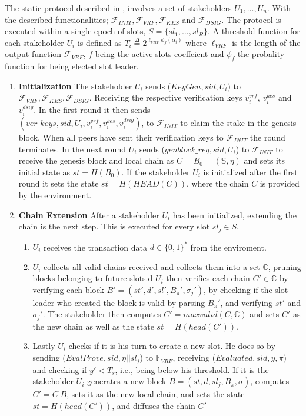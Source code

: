 The static protocol described in \cite{ouroboros-praos}, involves a set of stakeholders $U_1,\dots, U_n$. With the described functionalities; $\mathcal{F}_{INIT}, \mathcal{F}_{VRF}, \mathcal{F}_{KES}$ and $\mathcal{F}_{DSIG}$. The protocol is executed within a single epoch of slots, $S = \{sl_1, \dots, sl_R\}$. A threshold function for each stakeholder $U_i$ is defined as $T_i \overset{\Delta}{=} 2^{\ell_{VRF} \phi_f(\alpha_i)}$ where $\ell_{VRF}$ is the length of the output function $\mathcal{F}_{VRF}$, $f$ being the active slots coeffcient and $\phi_f$ the probality function for being elected slot leader.
\begin{enumerate}
    \item \textbf{Initialization} The stakeholder $U_i$ sends ($KeyGen, sid, U_i$) to $\mathcal{F}_{VRF}, \mathcal{F}_{KES}, \mathcal{F}_{DSIG}$. Receiving the respective verification keys $v_i^{vrf}$, $v_i^{kes}$ and $v_i^{dsig}$.  In the first round it then sends \\ $(ver\_keys, sid, U_i, v_i^{vrf}, v_i^{kes}, v_i^{dsig} )$, to $\mathcal{F}_{INIT}$ to claim the stake in the genesis block. When all peers have sent their verification keys to $\mathcal{F}_{INIT}$ the round terminates. In the next round $U_i$ sends ($genblock\_req, sid, U_i$) to $\mathcal{F}_{INIT}$ to receive the genesis block and local chain as $C = B_0 = (\mathbb{S}, \eta)$ and sets its initial state as $st = H(B_0)$. If the stakeholder $U_i$ is initialized after the first round it sets the state $st = H(HEAD(C))$, where the chain $C$ is provided by the environment.
    \item \textbf{Chain Extension} After a stakeholder $U_i$ has been initialized,  extending the chain is the next step. This is executed for every slot $sl_j  \in S$.
    \begin{enumerate}
        \item $U_i$ receives the transaction data $d \in \{0,1\}^*$ from the enviroment.
        \item $U_i$ collects all valid chains received and collects them into a set $\mathbb{C}$, pruning blocks belonging to future slots.d $U_i$ then verifies each chain $C' \in \mathbb{C}$ by verifying each block $B' = (st',d', sl', B_{\pi}', \sigma_j')$, by checking if the slot leader who created the block is valid by parsing $B_{\pi}'$, and verifying $st'$ and $\sigma_j'$. The stakeholder then computes $C' = maxvalid(C,\mathbb{C})$ and sets $C'$ as the new chain as well as the state $st = H(head(C'))$.
        \item Lastly $U_i$ checks if it is his turn to create a new slot. He does so by sending ($EvalProve, sid, \eta || sl_j$) to $\mathbb{F}_{VRF}$, receiving ($Evaluated, sid, y, \pi$) and checking if $y' < T_s$, i.e., being below his threshold. If it is the stakeholder $U_i$ generates a new block $B = (st,d,sl_j,B_{\pi}, \sigma)$, computes $C' = C|B$, sets it as the new local chain, and sets the state $st = H(head(C'))$, and diffuses the chain $C'$

\end{enumerate}
\end{enumerate}
